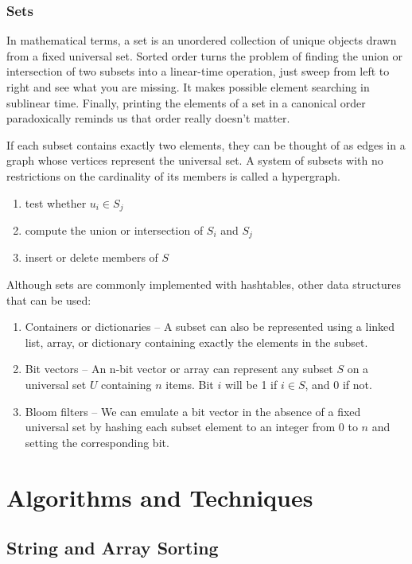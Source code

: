 \documentclass{article}
\begin{document}
    \subsubsection{Sets}
     In mathematical terms, a set is an unordered collection of unique objects drawn from a fixed universal set. Sorted order turns the problem of finding the union or intersection of two subsets into a linear-time operation, just sweep from left to right and see what you are missing. It makes possible element searching in sublinear time. Finally, printing the elements of a set in a canonical order paradoxically reminds us that order really doesn’t matter.
     
     If each subset contains exactly two elements, they can be thought of as edges in a graph whose vertices represent the universal set. A system of subsets with no restrictions on the cardinality of its members is called a hypergraph.
    
    \begin{enumerate}
        \item test whether $u_i \in S_j$
        \item compute the union or intersection of $S_i$ and $S_j$
        \item insert or delete members of $S$
    \end{enumerate}
    
    Although sets are commonly implemented with hashtables, other data structures that can be used:
    
    \begin{enumerate}
        \item Containers or dictionaries – A subset can also be represented using a linked list, array, or dictionary containing exactly the elements in the subset.
        \item Bit vectors – An n-bit vector or array can represent any subset $S$ on a universal set $U$ containing $n$ items. Bit $i$ will be 1 if $i \in S$, and $0$ if not.
        \item Bloom filters – We can emulate a bit vector in the absence of a fixed universal set by hashing each subset element to an integer from $0$ to $n$ and setting the corresponding bit.
    \end{enumerate}

\newpage    
\section{Algorithms and Techniques}
    \subsection{String and Array Sorting}
\end{document}
